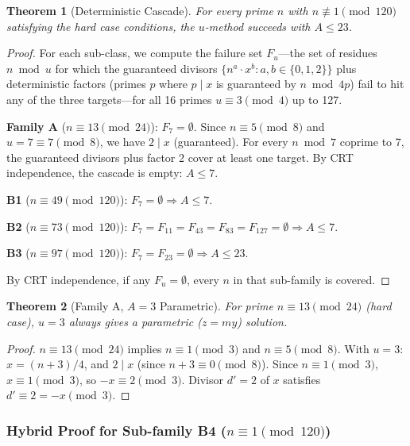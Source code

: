 \documentclass[11pt,a4paper]{article}
\theoremstyle{plain}
\newtheorem{theorem}{Theorem}[section]
\theoremstyle{plain}
\theoremstyle{definition}
\numberwithin{equation}{section}
\begin{document}
\begin{theorem}[Deterministic Cascade]\label{thm:cascade}
For every prime $n$ with $n \not\equiv 1 \pmod{120}$ satisfying the hard case conditions, the $u$-method succeeds with $A \leq 23$.
\end{theorem}

\begin{proof}
For each sub-class, we compute the failure set $F_u$---the set of residues $n \bmod u$ for which the guaranteed divisors $\{n^a \cdot x^b : a, b \in \{0,1,2\}\}$ plus deterministic factors (primes $p$ where $p \mid x$ is guaranteed by $n \bmod 4p$) fail to hit any of the three targets---for all 16 primes $u \equiv 3 \pmod{4}$ up to 127.

\textbf{Family A} ($n \equiv 13 \pmod{24}$): $F_7 = \emptyset$. Since $n \equiv 5 \pmod{8}$ and $u = 7 \equiv 7 \pmod{8}$, we have $2 \mid x$ (guaranteed). For every $n \bmod 7$ coprime to 7, the guaranteed divisors plus factor 2 cover at least one target. By CRT independence, the cascade is empty: $A \leq 7$.

\textbf{B1} ($n \equiv 49 \pmod{120}$): $F_7 = \emptyset \Rightarrow A \leq 7$.

\textbf{B2} ($n \equiv 73 \pmod{120}$): $F_7 = F_{11} = F_{43} = F_{83} = F_{127} = \emptyset \Rightarrow A \leq 7$.

\textbf{B3} ($n \equiv 97 \pmod{120}$): $F_7 = F_{23} = \emptyset \Rightarrow A \leq 23$.

By CRT independence, if any $F_u = \emptyset$, every $n$ in that sub-family is covered.
\end{proof}

\begin{theorem}[Family A, $A = 3$ Parametric]\label{thm:familyA}
For prime $n \equiv 13 \pmod{24}$ (hard case), $u = 3$ always gives a parametric ($z = my$) solution.
\end{theorem}

\begin{proof}
$n \equiv 13 \pmod{24}$ implies $n \equiv 1 \pmod{3}$ and $n \equiv 5 \pmod{8}$. With $u = 3$: $x = (n+3)/4$, and $2 \mid x$ (since $n + 3 \equiv 0 \pmod{8}$). Since $n \equiv 1 \pmod{3}$, $x \equiv 1 \pmod{3}$, so $-x \equiv 2 \pmod{3}$. Divisor $d' = 2$ of $x$ satisfies $d' \equiv 2 = -x \pmod{3}$.
\end{proof}

\subsubsection{Hybrid Proof for Sub-family B4 ($n \equiv 1 \pmod{120}$)}
\end{document}
